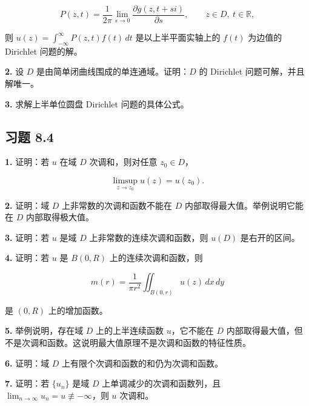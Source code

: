 \documentclass[11pt,a4paper]{article}
\begin{document}
\[
P(z,t)=\frac1{2\pi}\lim_{s\to0}\frac{\partial g(z,t+si)}{\partial s},\qquad z\in D,\ t\in\mathbb R,
\]

则 \(\displaystyle u(z)=\int_{-\infty}^{\infty}P(z,t)f(t)\,dt\)
是以上半平面实轴上的 \(f(t)\) 为边值的 Dirichlet 问题的解。

\par{}
\noindent\textbf{2.} 设 \(D\) 是由简单闭曲线围成的单连通域。证明：\(D\) 的
Dirichlet 问题可解，并且解唯一。

\par{}
\noindent\textbf{3.} 求解上半单位圆盘 Dirichlet 问题的具体公式。

\subsection{习题 8.4}\label{ch08-practice-heading-5}

\par{}
\noindent\textbf{1.} 证明：若 \(u\) 在域 \(D\) 次调和，则对任意 \(z_0\in D\)，

\[
\limsup_{z\to z_0}u(z)=u(z_0).
\]

\par{}
\noindent\textbf{2.} 证明：域 \(D\) 上非常数的次调和函数不能在 \(D\)
内部取得最大值。举例说明它能在 \(D\) 内部取得极大值。

\par{}
\noindent\textbf{3.} 证明：若 \(u\) 是域 \(D\) 上非常数的连续次调和函数，则
\(u(D)\) 是右开的区间。

\par{}
\noindent\textbf{4.} 证明：若 \(u\) 是 \(B(0,R)\) 上的连续次调和函数，则

\[
m(r)=\frac1{\pi r^2}\iint_{B(0,r)}u(z)\,dx\,dy
\]

是 \((0,R)\) 上的增加函数。

\par{}
\noindent\textbf{5.} 举例说明，存在域 \(D\) 上的上半连续函数 \(u\)，它不能在
\(D\)
内部取得最大值，但不是次调和函数。这说明最大值原理不是次调和函数的特征性质。

\par{}
\noindent\textbf{6.} 证明：域 \(D\) 上有限个次调和函数的和仍为次调和函数。

\par{}
\noindent\textbf{7.} 证明：若 \(\{u_n\}\) 是域 \(D\) 上单调减少的次调和函数列，且
\(\lim_{n\to\infty}u_n=u\not\equiv-\infty\)，则 \(u\) 次调和。
\end{document}
